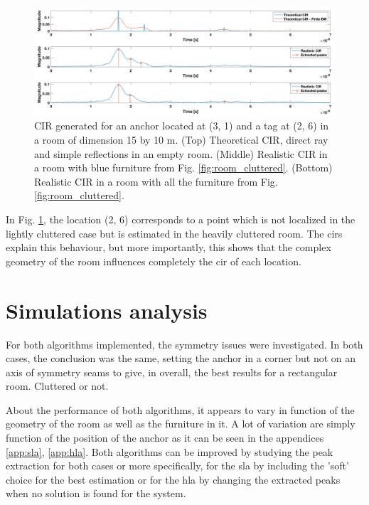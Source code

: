 \begin{figure}[H]
\centering
\includegraphics[width=.9\linewidth]{Images/image_1.png}
\caption{CIR generated for an anchor located at (3, 1) and a tag at (2, 6) in a room of dimension 15 by 10 m. (Top) Theoretical CIR, direct ray and simple reflections in an empty room. (Middle) Realistic CIR in a room with blue furniture from Fig. \ref{fig:room_cluttered}. (Bottom) Realistic CIR in a room with all the furniture from Fig. \ref{fig:room_cluttered}. \label{fig:cir_hla_1}}
\end{figure}

In Fig. \ref{fig:cir_hla_1}, the location (2, 6) corresponds to a point which is not localized in the lightly cluttered case but is estimated in the heavily cluttered room. The \glspl{cir} explain this behaviour, but more importantly, this shows that the complex geometry of the room influences completely the \gls{cir} of each location.



\section{Simulations analysis}
\label{simu_anal}

For both algorithms implemented, the symmetry issues were investigated. In both cases, the conclusion was the same, setting the anchor in a corner but not on an axis of symmetry seams to give, in overall, the best results for a rectangular room. Cluttered or not.
\vspace{2mm}

About the performance of both algorithms, it appears to vary in function of the geometry of the room as well as the furniture in it. A lot of variation are simply function of the position of the anchor as it can be seen in the appendices \ref{app:sla}, \ref{app:hla}. Both algorithms can be improved by studying the peak extraction for both cases or more specifically, for the \gls{sla} by including the 'soft' choice for the best estimation or for the \gls{hla} by changing the extracted peaks when no solution is found for the system.


